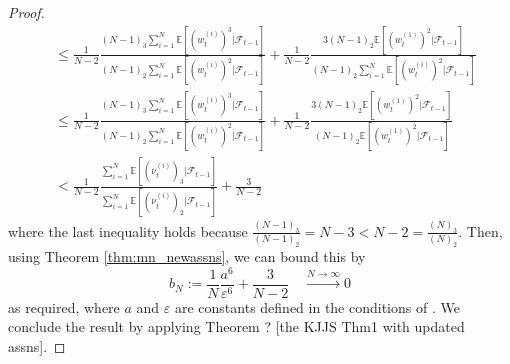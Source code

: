 \documentclass[fleqn]{article}
\theoremstyle{definition}
\newcommand{\E}{\mathbb{E}}
\newcommand{\Ntoinfty}{\overset{N\to\infty}{\longrightarrow}}
\newcommand{\F}{\mathcal{F}_{t-1}}
\newcommand{\vt}[2][t]{\nu_{#1}^{(#2)}}
\newcommand{\wt}[2][t]{w_{#1}^{(#2)}}
\begin{document}
\begin{proof}
\begin{align*}
&\leq \frac{1}{N-2} \frac{(N-1)_3 \sum_{i=1}^{N} \E[(\wt{i})^3 |\F]}{(N-1)_2 \sum_{i=1}^{N} \E[(\wt{i})^2 |\F]} + \frac{1}{N-2} \frac{3(N-1)_2 \E[(\wt{1})^2 |\F]}{(N-1)_2 \sum_{i=1}^{N} \E[(\wt{i})^2 |\F]} \\
&\leq \frac{1}{N-2} \frac{(N-1)_3 \sum_{i=1}^{N} \E[(\wt{i})^3 |\F]}{(N-1)_2 \sum_{i=1}^{N} \E[(\wt{i})^2 |\F]} + \frac{1}{N-2} \frac{3(N-1)_2 \E[(\wt{1})^2 |\F]}{(N-1)_2 \E[(\wt{1})^2 |\F]} \\
&<  \frac{1}{N-2} \frac{\sum_{i=1}^{N} \E[(\vt{i})_3 |\F]}{\sum_{i=1}^{N} \E[(\vt{i})_2 |\F]} + \frac{3}{N-2}
\end{align*}
where the last inequality holds because $\frac{(N-1)_3}{(N-1)_2} = N-3 < N-2 = \frac{(N)_3}{(N)_2}$.
Then, using Theorem \ref{thm:mn_newassns}, we can bound this by
\begin{equation*}
b_N := \frac{1}{N}\frac{a^6}{\varepsilon^6} + \frac{3}{N-2} \quad \Ntoinfty 0
\end{equation*}
as required, where $a$ and $\varepsilon$ are constants defined in the conditions of \citet[Lemma 3]{koskela2018}.
We conclude the result by applying Theorem ? [the KJJS Thm1 with updated assns].
\end{proof}


\end{document}
